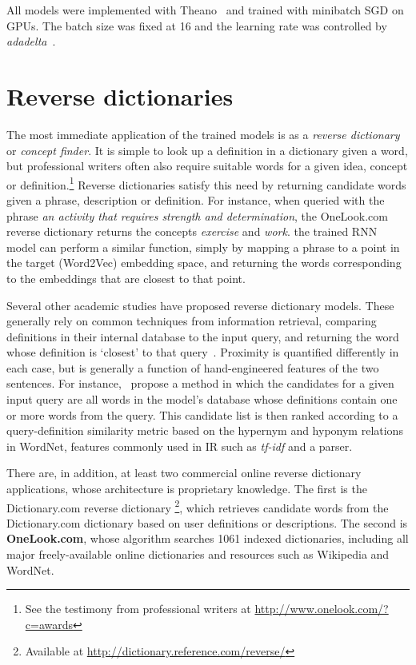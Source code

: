 All models were implemented with Theano~\citep{bergstra+al:2010-scipy} and trained with minibatch SGD on GPUs. The batch size was fixed at 16 and the learning rate was controlled by \emph{adadelta}~\citep{zeiler2012adadelta}. %

\section{Reverse dictionaries}

The most immediate application of the trained models is as a \emph{reverse dictionary} or \emph{concept finder}. It is simple to look up a definition in a dictionary given a word, but professional writers often also require suitable words for a given idea, concept or definition.\footnote{See the testimony from professional writers at \url{http://www.onelook.com/?c=awards}} Reverse dictionaries satisfy this need by returning candidate words given a phrase, description or definition. For instance, when queried with the phrase \emph{an activity that requires strength and determination}, the OneLook.com reverse dictionary returns the concepts \emph{exercise} and \emph{work}. the trained RNN model can perform a similar function, simply by mapping a phrase to a point in the target (Word2Vec) embedding space, and returning the words corresponding to the embeddings that are closest to that point.  

Several other academic studies have proposed reverse dictionary models. These generally rely on common techniques from information retrieval, comparing definitions in their internal database to the input query, and returning the word whose definition is `closest' to that query~\citep{bilac2003improving,bilac2004dictionary,zock2004word}. Proximity is quantified differently in each case, but is generally a function of hand-engineered features of the two sentences. For instance,~\cite{shaw2013building} propose a method in which the candidates for a given input query are all words in the model's database whose definitions contain one or more words from the query. This candidate list is then ranked according to a query-definition similarity metric based on the hypernym and hyponym relations in WordNet, features commonly used in IR such as \emph{tf-idf} and a parser. 

There are, in addition, at least two commercial online reverse dictionary applications, whose architecture is proprietary knowledge. The first is the Dictionary.com reverse dictionary \footnote{Available at \url{http://dictionary.reference.com/reverse/}}, which retrieves candidate words from the Dictionary.com dictionary based on user definitions or descriptions. The second is {\bf OneLook.com}, whose algorithm searches 1061 indexed dictionaries, including all major freely-available online dictionaries and resources such as Wikipedia and WordNet.

